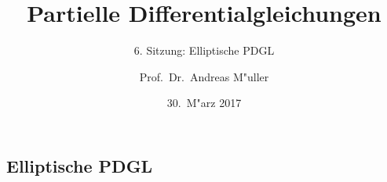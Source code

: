 \documentclass[handout]{beamer}
\title[]{Partielle Differentialgleichungen}
\subtitle{6. Sitzung: Elliptische PDGL}
\date[30.~M"arz 2017]{30.~M"arz 2017}
\author{Prof.~Dr.~Andreas M"uller}
\begin{document}
\begin{frame}
\section{Elliptische PDGL}
\titlepage

\end{frame}


\end{document}
